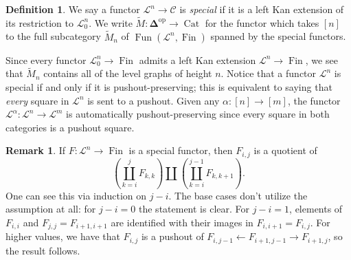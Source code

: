 \documentclass{amsart}
\numberwithin{theorem}{subsection}
\theoremstyle{definition}
\newtheorem{definition}[theorem]{Definition}
\newtheorem{remark}[theorem]{Remark}
\providecommand{\op}{\mathrm{op}}
\newcommand{\xFun}{\operatorname{Fun}}
\newcommand{\finset}{\operatorname{Fin}}
\newcommand{\xCat}{\operatorname{Cat}}
\newcommand{\xcc}{\mathcal{C}}
\newcommand{\simp}{\mathbf{\Delta}}
\newcommand{\scriptyell}{\mathscr L}
\begin{document}
\begin{definition}\label{definition special and tilde M}
	We say a functor $\scriptyell^{n}\to \xcc$ is \emph{special} if it is a left Kan extension of its restriction to $\scriptyell^{n}_0$.
	We write $\widetilde{M}\colon \simp^\op \to \xCat$ for the functor which takes $[n]$ to the full subcategory $\widetilde{M}_n$ of $\xFun(\scriptyell^{n},\finset)$ spanned by the special functors.
\end{definition}

Since every functor $\scriptyell^{n}_0 \to \finset$ admits a left Kan extension $\scriptyell^{n} \to \finset$, we see that $\widetilde{M}_n$ contains all of the level graphs of height $n$.
Notice that a functor $\scriptyell^{n}$ is special if and only if it is pushout-preserving; this is equivalent to saying that \emph{every} square in $\scriptyell^{n}$ is sent to a pushout.
Given any $\alpha\colon [n] \to [m]$, the functor $\scriptyell^\alpha \colon \scriptyell^n \to \scriptyell^m$ is automatically pushout-preserving since every square in both categories is a pushout square.

\begin{remark}\label{remark quotients}
If $F \colon \scriptyell^n \to \finset$ is a special functor, then $F_{i,j}$ is a quotient of
\begin{equation*}
\left( \coprod_{k=i}^j F_{k,k} \right) \amalg \left( \coprod_{k=i}^{j-1} F_{k,k+1} \right).
\end{equation*}
One can see this via induction on $j-i$.
The base cases don't utilize the assumption at all: for $j-i = 0$ the statement is clear.
For $j-i = 1$, elements of $F_{i,i}$ and $F_{j,j} = F_{i+1,i+1}$ are identified with their images in $F_{i,i+1} = F_{i,j}$.
For higher values, we have that $F_{i,j}$ is a pushout of $F_{i,j-1} \leftarrow F_{i+1,j-1} \rightarrow F_{i+1,j}$, so the result follows.
\end{remark}
\end{document}

